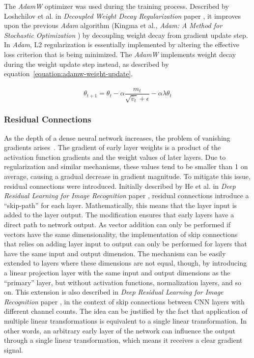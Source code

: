 \documentclass[a4paper,11pt,twoside]{report}
\theoremstyle{definition}
\begin{document}
The \textit{AdamW} optimizer was used during the training process. Described by Loshchilov et al. in \textit{Decoupled Weight Decay Regularization} paper \cite{loshchilov2019adamw}, it improves upon the previous \textit{Adam} algorithm (Kingma et al., \textit{Adam: A Method for Stochastic Optimization} \cite{kingma2015adam}) by decoupling weight decay from gradient update step. In \textit{Adam}, L2 regularization is essentially implemented by altering the effective loss criterion that is being minimized. The \textit{AdamW} implements weight decay during the weight update step instead, as described by equation~\ref{equation:adamw-weight-update}. 

\begin{equation}
\label{equation:adamw-weight-update}
    \theta_{t+1} = \theta_t - \alpha \frac{\hat{m}_t}{\sqrt{\hat{v}_t} + \epsilon} - \alpha \lambda \theta_t
\end{equation}

\subsubsection{Residual Connections}

As the depth of a dense neural network increases, the problem of vanishing gradients arises~\cite{he2016deep}. The gradient of early layer weights is a product of the activation function gradients and the weight values of later layers. Due to regularization and similar mechanisms, these values tend to be smaller than 1 on average, causing a gradual decrease in gradient magnitude. To mitigate this issue, residual connections were introduced. Initially described by He et al. in \textit{Deep Residual Learning for Image Recognition} paper \cite{he2016deep}, residual connections introduce a ``skip-path'' for each layer. Mathematically, this means that the layer input is added to the layer output. The modification ensures that early layers have a direct path to network output. As vector addition can only be performed if vectors have the same dimensionality, the implementation of skip connections that relies on adding layer input to output can only be performed for layers that have the same input and output dimension. The mechanism can be easily extended to layers where these dimensions are not equal, though, by introducing a linear projection layer with the same input and output dimensions as the ``primary'' layer, but without activation functions, normalization layers, and so on. This extension is also described in \textit{Deep Residual Learning for Image Recognition} paper \cite{he2016deep}, in the context of skip connections between CNN layers with different channel counts. The idea can be justified by the fact that application of multiple linear transformations is equivalent to a single linear transformation. In other words, an arbitrary early layer of the network can influence the output through a single linear transformation, which means it receives a clear gradient signal. 
\end{document}
